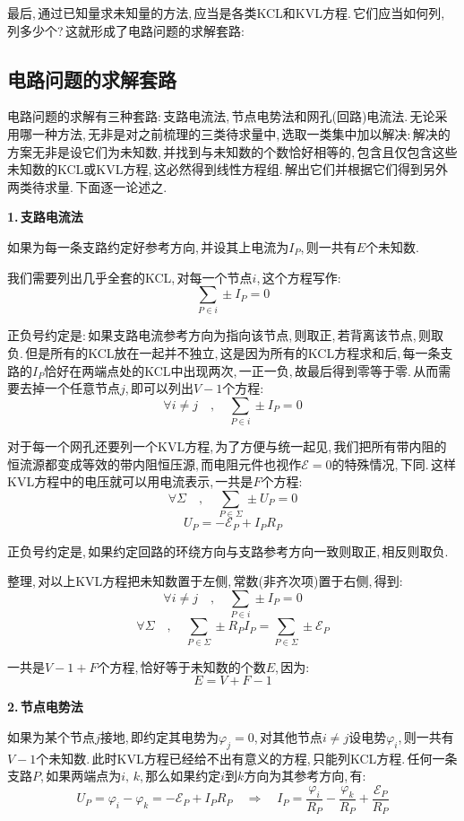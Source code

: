 最后,\,通过已知量求未知量的方法,\,应当是各类KCL和KVL方程.\,它们应当如何列,\,列多少个?\,这就形成了电路问题的求解套路:

\subsection{电路问题的求解套路}

电路问题的求解有三种套路:\,支路电流法,\,节点电势法和网孔(回路)电流法.\,无论采用哪一种方法,\,无非是对之前梳理的三类待求量中,\,选取一类集中加以解决:\,解决的方案无非是设它们为未知数,\,并找到与未知数的个数恰好相等的,\,包含且仅包含这些未知数的KCL或KVL方程,\,这必然得到线性方程组.\,解出它们并根据它们得到另外两类待求量.\,下面逐一论述之.

\vspace{0.2cm}
\textbf{1.\,支路电流法}
\vspace{0.2cm}

如果为每一条支路约定好参考方向,\,并设其上电流为$I_P$,\,则一共有$E$个未知数.

我们需要列出几乎全套的KCL,\,对每一个节点$i$,\,这个方程写作:
\[\sum_{P\in i} \pm I_P=0\]

正负号约定是:\,如果支路电流参考方向为指向该节点,\,则取正,\,若背离该节点,\,则取负.\,但是所有的KCL放在一起并不独立,\,这是因为所有的KCL方程求和后,\,每一条支路的$I_P$恰好在两端点处的KCL中出现两次,\,一正一负,\,故最后得到零等于零.\,从而需要去掉一个任意节点$j$,\,即可以列出$V-1$个方程:
\[\forall i\neq j \quad ,\quad \sum_{P\in i} \pm I_P=0\]

对于每一个网孔还要列一个KVL方程,\,为了方便与统一起见,\,我们把所有带内阻的恒流源都变成等效的带内阻恒压源,\,而电阻元件也视作$\mathscr{E}=0$的特殊情况,\,下同.\,这样KVL方程中的电压就可以用电流表示,\,一共是$F$个方程:
\[\forall \Sigma \quad ,\quad \sum_{P\in \Sigma } \pm U_P=0\]
\[U_P=-\mathscr{E}_P+I_P R_P \]

正负号约定是,\,如果约定回路的环绕方向与支路参考方向一致则取正,\,相反则取负.

整理,\,对以上KVL方程把未知数置于左侧,\,常数(非齐次项)置于右侧,\,得到:
\[\forall i\neq j \quad ,\quad \sum_{P\in i} \pm I_P=0\]
\[\forall \Sigma \quad ,\quad \sum_{P\in \Sigma } \pm R_P I_P=\sum_{P\in \Sigma } \pm \mathscr{E}_P\]

一共是$V-1+F$个方程,\,恰好等于未知数的个数$E$,\,因为:
\[E=V+F-1\]

\vspace{0.2cm}
\textbf{2.\,节点电势法}
\vspace{0.2cm}

如果为某个节点$j$接地,\,即约定其电势为$\varphi_j=0$,\,对其他节点$i\neq j$设电势$\varphi_i$,\,则一共有$V-1$个未知数.\,此时KVL方程已经给不出有意义的方程,\,只能列KCL方程.\,任何一条支路$P$,\,如果两端点为$i,\,k$,\,那么如果约定$i$到$k$方向为其参考方向,\,有:
\[U_P=\varphi_i-\varphi_k =- \mathscr{E}_P+ I_PR_P \quad \Rightarrow \quad I_P=\frac{\varphi_i}{R_P}-\frac{\varphi_k}{R_P}+\frac{\mathscr{E}_P}{R_P}\]


